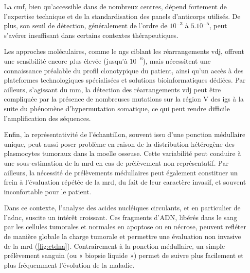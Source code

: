 \vspace{1em}

La \gls{cmf}, bien qu'accessible dans de nombreux centres, dépend fortement de l'expertise technique et de la standardisation
des panels d'anticorps utilisés. De plus, son seuil de détection, généralement de l'ordre de $10^{-3}$ à $5.10^{-5}$, peut s'avérer insuffisant dans certains contextes
thérapeutiques.

\vspace{1em}

Les approches moléculaires, comme le \gls{ngs} ciblant les réarrangements \gls{vdj}, offrent une sensibilité encore plus élevée (jusqu'à $10^{-6}$),
mais nécessitent une connaissance préalable du profil clonotypique du patient, ainsi qu'un accès à des plateformes technologiques spécialisées et solutions 
bioinformatiques dédiées. Par ailleurs, s'agissant du \gls{mm}, la détection des réarrangements \gls{vdj} peut être compliquée par la présence de nombreuses 
mutations sur la région V des \glspl{ig} à la suite du phénomène d'hypermutation somatique, ce qui peut rendre difficile l'amplification des séquences.

\vspace{1em}

Enfin, la représentativité de l'échantillon, souvent issu d'une ponction médullaire unique, peut aussi poser problème en raison de la distribution hétérogène
des plasmocytes tumoraux dans la moelle osseuse. Cette variabilité peut conduire à une sous-estimation de la \gls{mrd} en cas de prélèvement non représentatif.
Par ailleurs, la nécessité de prélèvements médullaires peut également constituer un frein à l'évaluation répétée de la \gls{mrd}, du fait de leur caractère
invasif, et souvent inconfortable pour le patient.

\vspace{1em}

Dans ce contexte, l'analyse des acides nucléiques circulants, et en particulier de l'\gls{adnc}, suscite un intérêt croissant. Ces fragments d'ADN, libérés dans le sang 
par les cellules tumorales et normales en apoptose ou en nécrose, peuvent refléter de manière globale la charge tumorale et permettre une évaluation non 
invasive de la \gls{mrd} (\autoref{fig:ctdna}). Contrairement à la ponction médullaire, un simple prélèvement sanguin (ou « biopsie liquide ») permet de suivre plus facilement 
et plus fréquemment l'évolution de la maladie.

\vspace{1em}

